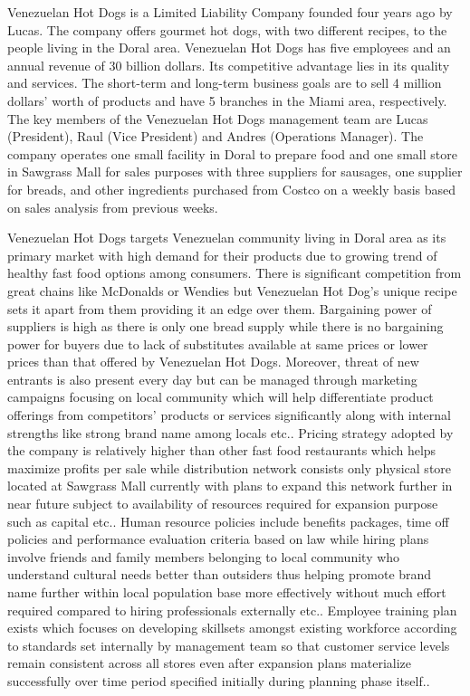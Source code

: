 
Venezuelan Hot Dogs is a Limited Liability Company founded four years ago by Lucas. The company offers gourmet hot dogs, with two different recipes, to the people living in the Doral area. Venezuelan Hot Dogs has five employees and an annual revenue of 30 billion dollars. Its competitive advantage lies in its quality and services. The short-term and long-term business goals are to sell 4 million dollars’ worth of products and have 5 branches in the Miami area, respectively. The key members of the Venezuelan Hot Dogs management team are Lucas (President), Raul (Vice President) and Andres (Operations Manager). The company operates one small facility in Doral to prepare food and one small store in Sawgrass Mall for sales purposes with three suppliers for sausages, one supplier for breads, and other ingredients purchased from Costco on a weekly basis based on sales analysis from previous weeks. 

Venezuelan Hot Dogs targets Venezuelan community living in Doral area as its primary market with high demand for their products due to growing trend of healthy fast food options among consumers. There is significant competition from great chains like McDonalds or Wendies but Venezuelan Hot Dog’s unique recipe sets it apart from them providing it an edge over them. Bargaining power of suppliers is high as there is only one bread supply while there is no bargaining power for buyers due to lack of substitutes available at same prices or lower prices than that offered by Venezuelan Hot Dogs. Moreover, threat of new entrants is also present every day but can be managed through marketing campaigns focusing on local community which will help differentiate product offerings from competitors’ products or services significantly along with internal strengths like strong brand name among locals etc.. Pricing strategy adopted by the company is relatively higher than other fast food restaurants which helps maximize profits per sale while distribution network consists only physical store located at Sawgrass Mall currently with plans to expand this network further in near future subject to availability of resources required for expansion purpose such as capital etc.. Human resource policies include benefits packages, time off policies and performance evaluation criteria based on law while hiring plans involve friends and family members belonging to local community who understand cultural needs better than outsiders thus helping promote brand name further within local population base more effectively without much effort required compared to hiring professionals externally etc.. Employee training plan exists which focuses on developing skillsets amongst existing workforce according to standards set internally by management team so that customer service levels remain consistent across all stores even after expansion plans materialize successfully over time period specified initially during planning phase itself..  

